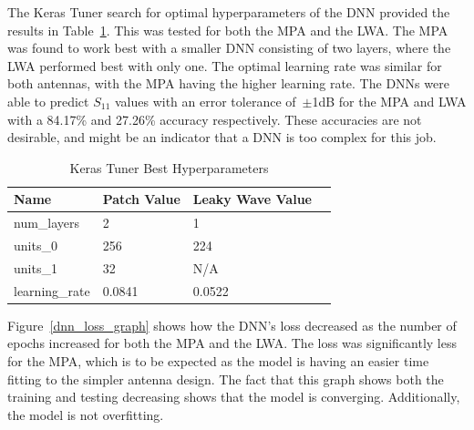 \documentclass[conference]{IEEEtran}
\begin{document}
The Keras Tuner search for optimal hyperparameters of the DNN provided the results in Table~\ref{keras_best_params}. This was tested for both the MPA and the LWA. The MPA was found to work best with a smaller DNN consisting of two layers, where the LWA performed best with only one. The optimal learning rate was similar for both antennas, with the MPA having the higher learning rate. The DNNs were able to predict $S_{11}$ values with an error tolerance of~$\pm$1dB for the MPA and LWA with a 84.17\% and 27.26\% accuracy respectively. These accuracies are not desirable, and might be an indicator that a DNN is too complex for this job.

\begin{table}[h]
\caption{Keras Tuner Best Hyperparameters}
\begin{center}
\begin{tabular}{ |l|l|l|l| }
    \hline
    Name & Patch Value & Leaky Wave Value \\ 
    \hline
    num\_layers & 2 & 1 \\  
    \hline
    units\_0 & 256 & 224 \\
    \hline
    units\_1 & 32 & N/A \\
    \hline
    learning\_rate & 0.0841 & 0.0522 \\
    \hline
\end{tabular}
\end{center}
\label{keras_best_params}
\end{table}

Figure~\ref{dnn_loss_graph} shows how the DNN's loss decreased as the number of epochs increased for both the MPA and the LWA. The loss was significantly less for the MPA, which is to be expected as the model is having an easier time fitting to the simpler antenna design. The fact that this graph shows both the training and testing decreasing shows that the model is converging. Additionally, the model is not overfitting. 
\end{document}
